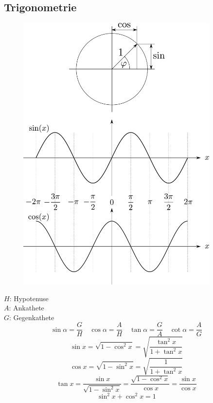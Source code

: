\newpage
\subsection{Trigonometrie}

\begin{figure}[h!]
\centering
\includegraphics[width=0.9\textwidth]{einheitskreis.pdf}
\end{figure}

\newpage
\noindent
$H$: Hypotenuse\\
$A$: Ankathete\\
$G$: Gegenkathete
\[ \boxed{\sin\alpha=\frac{G}{H}} \quad \boxed{\cos\alpha=\frac{A}{H}} \quad \boxed{\tan\alpha=\frac{G}{A}} \quad \boxed{\cot\alpha=\frac{A}{G}} \]
\[ \boxed{\sin x = \sqrt{1-\cos^2x} = \sqrt{\frac{\tan^2x}{1+\tan^2x}}} \]
\[ \boxed{\cos x = \sqrt{1-\sin^2x} = \sqrt{\frac{1}{1+\tan^2x}}} \]
\[ \boxed{\tan x = \frac{\sin x}{\sqrt{1-\sin^2x}} = \frac{\sqrt{1-\cos^2x}}{\cos x} = \frac{\sin x}{\cos x}} \]
\[ \boxed{\sin^2 x + \cos^2 x = 1} \]

